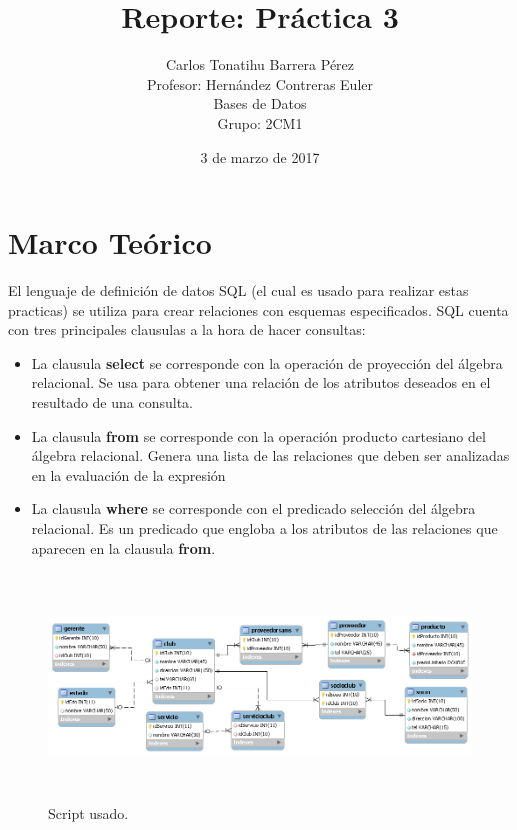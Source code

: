 \documentclass[12pt, titlepage]{article}
\title{Reporte: Práctica 3}
\author{Carlos Tonatihu Barrera Pérez \\ Profesor: Hernández Contreras Euler \\ Bases de Datos \\ Grupo: 2CM1 }
\date{3 de marzo de 2017}
\begin{document}
    \maketitle
    \tableofcontents
    \section{Marco Teórico}
    El lenguaje de definición de datos SQL (el cual es usado para realizar estas practicas) se utiliza para crear relaciones con esquemas especificados.
    SQL cuenta con tres principales clausulas a la hora de hacer consultas:
    \begin{itemize}
    \item La clausula \textbf{select} se corresponde con la operación de proyección del álgebra relacional. Se usa para obtener una relación de los atributos deseados en el resultado de una consulta.
    \item La clausula \textbf{from} se corresponde con la operación producto cartesiano del álgebra relacional. Genera una lista de las relaciones que deben ser analizadas en la evaluación de la expresión
    \item La clausula \textbf{where} se corresponde con el predicado selección del álgebra relacional. Es un predicado que engloba a los atributos de las relaciones que aparecen en la clausula \textbf{from}.
    \end{itemize}
    \begin{figure}[H]
        \begin{center}
            \includegraphics[width=12cm, height=6cm]{img/sams.png}
            \caption{Script usado.}
            \label{fig:hasta-use}
        \end{center}
    \end{figure}
    \newpage
\end{document}
